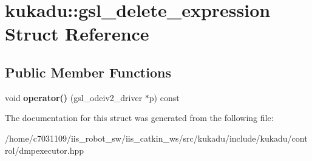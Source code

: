 \hypertarget{structkukadu_1_1gsl__delete__expression}{\section{kukadu\-:\-:gsl\-\_\-delete\-\_\-expression Struct Reference}
\label{structkukadu_1_1gsl__delete__expression}
}
\subsection*{Public Member Functions}
\begin{DoxyCompactItemize}
\item 
\hypertarget{structkukadu_1_1gsl__delete__expression_a2eef07907659d92f2165f0584fa59c81}{void {\bfseries operator()} (gsl\-\_\-odeiv2\-\_\-driver $\ast$p) const }\label{structkukadu_1_1gsl__delete__expression_a2eef07907659d92f2165f0584fa59c81}

\end{DoxyCompactItemize}


The documentation for this struct was generated from the following file\-:\begin{DoxyCompactItemize}
\item 
/home/c7031109/iis\-\_\-robot\-\_\-sw/iis\-\_\-catkin\-\_\-ws/src/kukadu/include/kukadu/control/dmpexecutor.\-hpp\end{DoxyCompactItemize}

